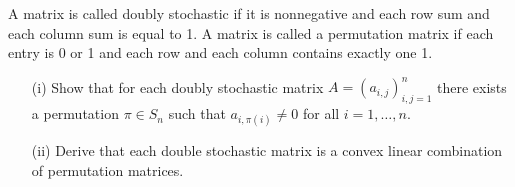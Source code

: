 \documentclass[10pt]{article}
\begin{document}
\begin{problem}[Problem 3.11]
A matrix is called doubly stochastic if it is nonnegative and each row sum and each column sum is equal to 1. A matrix is called a permutation matrix if each entry is 0 or 1 and each row and each column contains exactly one 1.
\begin{enumerate}
    \item[(i)]  Show that for each doubly stochastic matrix \( A = (a_{i,j} )^n_{i,j=1} \) there exists a permutation \( \pi\in S_n \) such that \( a_{i,\pi(i)}\neq 0 \) for all \( i=1,\ldots,n \).
    \item[(ii)] Derive that each double stochastic matrix is a convex linear combination of permutation matrices.
\end{enumerate}
\end{problem}
\end{document}
